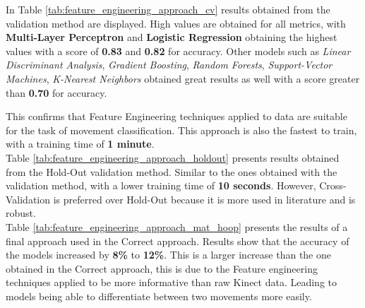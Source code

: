             In Table \ref{tab:feature_engineering_approach_cv} results obtained from the validation method are displayed. High values are obtained for all metrics, with \textbf{Multi-Layer Perceptron}  and \textbf{Logistic Regression} obtaining the highest values with a score of \textbf{0.83} and \textbf{0.82} for accuracy. Other models such as \textit{Linear Discriminant Analysis}, \textit{Gradient Boosting}, \textit{Random Forests}, \textit{Support-Vector Machines}, \textit{K-Nearest Neighbors} obtained great results as well with a score greater than \textbf{0.70} for accuracy. 

            This confirms that Feature Engineering techniques applied to data are suitable for the task of movement classification. This approach is also the fastest to train, with a training time of \textbf{1 minute}. \\

            Table \ref{tab:feature_engineering_approach_holdout} presents results obtained from the Hold-Out validation method. Similar to the ones obtained with the validation method, with a lower training time of \textbf{10 seconds}. However, Cross-Validation is preferred over Hold-Out because it is more used in literature and is robust.\\

            Table \ref{tab:feature_engineering_approach_mat_hoop} presents the results of a final approach used in the Correct approach. Results show that the accuracy of the models increased by \textbf{8\%} to \textbf{12\%}. This is a larger increase than the one obtained in the Correct approach, this is due to the Feature engineering techniques applied to be more informative than raw Kinect data. Leading to models being able to differentiate between two movements more easily. \\

